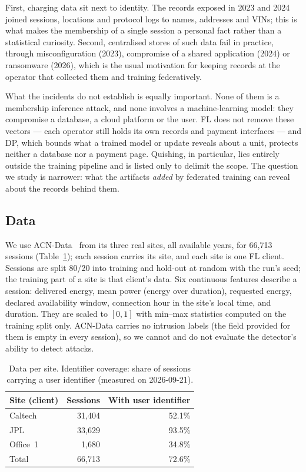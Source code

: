 First, charging data sit next to identity. The records exposed in 2023 and
2024 joined sessions, locations and protocol logs to names, addresses and
VINs; this is what makes the membership of a single session a personal fact
rather than a statistical curiosity. Second, centralised stores of such data
fail in practice, through misconfiguration (2023), compromise of a shared
application (2024) or ransomware (2026), which is the usual motivation for
keeping records at the operator that collected them and training federatively.

What the incidents do not establish is equally important. None of them is a
membership inference attack, and none involves a machine-learning model: they
compromise a database, a cloud platform or the user. FL does not remove these
vectors --- each operator still holds its own records and payment interfaces
--- and DP, which bounds what a trained model or update reveals about a unit,
protects neither a database nor a payment page. Quishing, in particular, lies
entirely outside the training pipeline and is listed only to delimit the
scope. The question we study is narrower: what the artifacts \emph{added} by
federated training can reveal about the records behind them.

\subsection{Data}
\label{sec:system-data}

We use ACN-Data~\cite{lee2019acndata} from its three real sites, all available
years, for 66{,}713 sessions (Table~\ref{tab:data}); each session carries its
site, and each site is one FL client. Sessions are split 80/20 into training
and hold-out at random with the run's seed; the training part of a site is
that client's data. Six continuous features describe a session: delivered
energy, mean power (energy over duration), requested energy, declared
availability window, connection hour in the site's local time, and duration.
They are scaled to $[0,1]$ with min--max statistics computed on the training
split only. ACN-Data carries no intrusion labels (the field provided for them
is empty in every session), so we cannot and do not evaluate the detector's
ability to detect attacks.

\begin{table}[t]
\centering
\caption{Data per site. Identifier coverage: share of sessions carrying a user
identifier (measured on 2026-09-21).}
\label{tab:data}
\footnotesize
\begin{tabular}{@{}lrr@{}}
\toprule
Site (client) & Sessions & With user identifier \\
\midrule
Caltech  & 31{,}404 & 52.1\% \\
JPL      & 33{,}629 & 93.5\% \\
Office~1 & 1{,}680  & 34.8\% \\
\midrule
Total    & 66{,}713 & 72.6\% \\
\bottomrule
\end{tabular}
\end{table}

